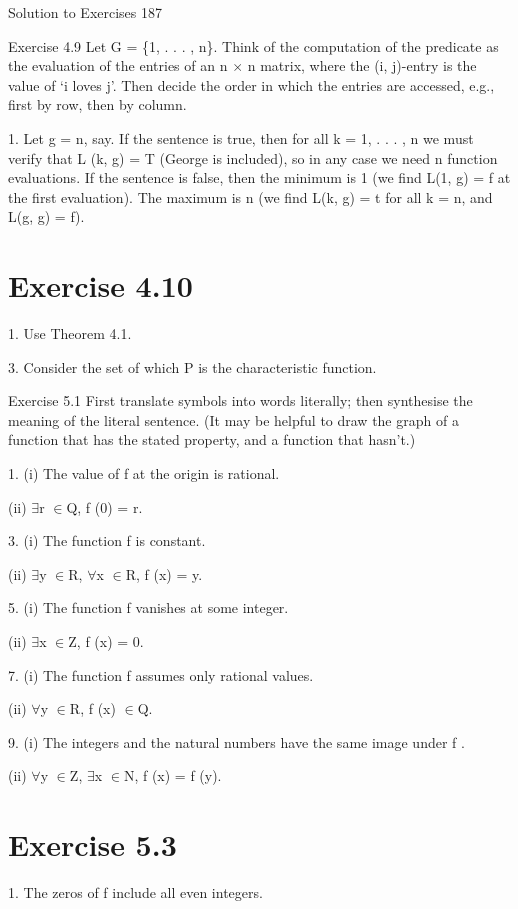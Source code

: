 \documentclass[11pt]{article}
\theoremstyle{plain}
\theoremstyle{definition}
\begin{document}
Solution to Exercises 187

Exercise 4.9 Let G = \{1, . . . , n\}. Think of the computation of the predicate as the evaluation of the entries of an n $\times$ n matrix, where the (i, j)-entry is the value of `i loves j'. Then decide the order in which the entries are accessed, e.g., first by row, then by column.

1. Let g = n, say. If the sentence is true, then for all k = 1, . . . , n we must verify that L (k, g) = T (George is included), so in any case we need n function evaluations. If the sentence is false, then the minimum is 1 (we find L(1, g) = f at the first evaluation). The maximum is n (we find L(k, g) = t for all k = n, and L(g, g) = f).

\section{Exercise 4.10}

1. Use Theorem 4.1.

3. Consider the set of which P is the characteristic function.

Exercise 5.1 First translate symbols into words literally; then synthesise the meaning of the literal sentence. (It may be helpful to draw the graph of a function that has the stated property, and a function that hasn't.)

1. (i) The value of f at the origin is rational.

(ii) $\exists$r $\in$Q, f (0) = r.

3. (i) The function f is constant.

(ii) $\exists$y $\in$R, $\forall$x $\in$R, f (x) = y.

5. (i) The function f vanishes at some integer.

(ii) $\exists$x $\in$Z, f (x) = 0.

7. (i) The function f assumes only rational values.

(ii) $\forall$y $\in$R, f (x) $\in$Q.

9. (i) The integers and the natural numbers have the same image under f .

(ii) $\forall$y $\in$Z, $\exists$x $\in$N, f (x) = f (y).

\section{Exercise 5.3}

1. The zeros of f include all even integers.
\end{document}
